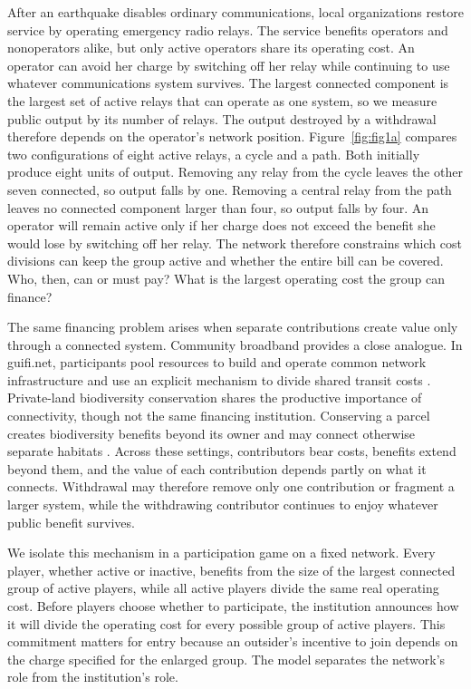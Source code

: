 \documentclass[preprint,12pt,authoryear]{elsarticle}
\begin{document}
After an earthquake disables ordinary communications, local organizations restore service by operating emergency radio relays. The service benefits operators and nonoperators alike, but only active operators share its operating cost. An operator can avoid her charge by switching off her relay while continuing to use whatever communications system survives. The largest connected component is the largest set of active relays that can operate as one system, so we measure public output by its number of relays. The output destroyed by a withdrawal therefore depends on the operator’s network position. Figure~\ref{fig:fig1a} compares two configurations of eight active relays, a cycle and a path. Both initially produce eight units of output. Removing any relay from the cycle leaves the other seven connected, so output falls by one. Removing a central relay from the path leaves no connected component larger than four, so output falls by four. An operator will remain active only if her charge does not exceed the benefit she would lose by switching off her relay. The network therefore constrains which cost divisions can keep the group active and whether the entire bill can be covered. Who, then, can or must pay? What is the largest operating cost the group can finance?

The same financing problem arises when separate contributions create value
only through a connected system. Community broadband provides a close analogue. In guifi.net, participants pool resources to build and operate common network infrastructure and use an explicit mechanism to divide shared transit costs \citep{BaigEtAl2015,CerdaAlabernEtAl2020}. Private-land biodiversity conservation shares the productive importance of connectivity, though not the same financing institution. Conserving a parcel creates biodiversity benefits beyond its owner and may connect otherwise separate habitats \citep{ParkhurstEtAl2002,PolaskyEtAl2014}. Across these settings, contributors bear costs, benefits extend beyond them, and the value of each contribution depends partly on what it connects. Withdrawal may therefore remove only one contribution or fragment a larger system, while the withdrawing contributor continues to enjoy whatever public benefit survives.

We isolate this mechanism in a participation game on a fixed network. Every
player, whether active or inactive, benefits from the size of the largest connected group of active players, while all active players divide the same real operating cost. Before players choose whether to participate, the institution announces how it will divide the operating cost for every possible group of active players. This commitment matters for entry because an outsider’s incentive to join depends on the charge specified for the enlarged group. The model separates the network's role from
the institution's role.
\end{document}
